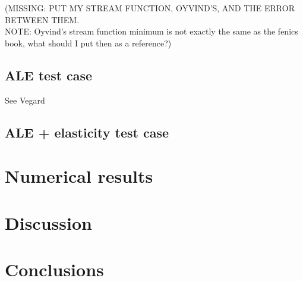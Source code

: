 \documentclass[11pt,a4paper,titlepage]{report}
\begin{document}
(MISSING: PUT MY STREAM FUNCTION, OYVIND'S, AND THE ERROR BETWEEN THEM. \\
NOTE: Oyvind's stream function minimum is not exactly the same as the fenics book, what should I put then as a reference?)


\section{ALE test case}
See Vegard
\section{ALE + elasticity test case}

\chapter{Numerical results}

\chapter{Discussion}

\chapter{Conclusions}
\end{document}
